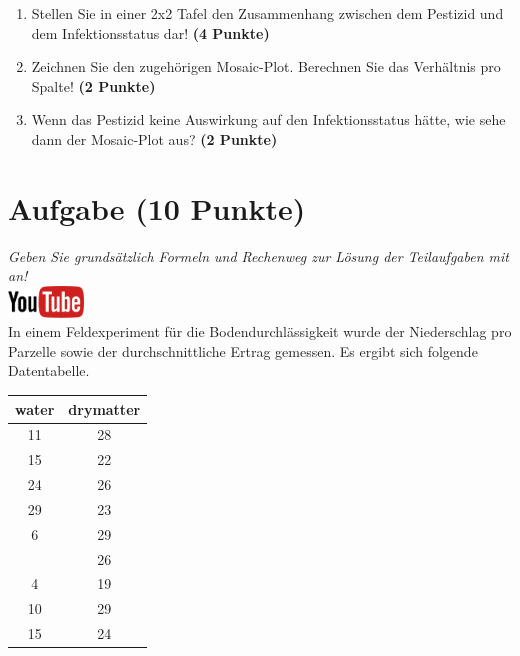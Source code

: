 \documentclass[a4paper, 10pt]{scrartcl}\usepackage[]{graphicx}\usepackage[]{xcolor}
\begin{document}
\begin{enumerate}
\item Stellen Sie in einer 2x2 Tafel den Zusammenhang zwischen dem
  Pestizid und dem Infektionsstatus dar! \textbf{(4 Punkte)}
\item Zeichnen Sie den zugeh{\"o}rigen Mosaic-Plot. Berechnen Sie das
  Verh{\"a}ltnis pro Spalte! \textbf{(2 Punkte)}
\item Wenn das Pestizid keine Auswirkung auf den Infektionsstatus h{\"a}tte, wie
  sehe dann der Mosaic-Plot aus? \textbf{(2 Punkte)}
\end{enumerate} 
\clearpage

\section{Aufgabe \hfill (10 Punkte)}

\textit{Geben Sie grunds{\"a}tzlich Formeln und Rechenweg zur L{\"o}sung der
  Teilaufgaben mit an!} \\[1Ex]

\hfill\href{https://youtu.be/VAqiUdV4WQ0}{\includegraphics[width =
  2cm]{img/youtube}}\\[1Ex]

In einem Feldexperiment f{\"u}r die Bodendurchl{\"a}ssigkeit wurde der Niederschlag
pro Parzelle sowie der durchschnittliche Ertrag gemessen. Es ergibt sich
folgende Datentabelle. 

\begin{table}[!h]
\centering
\begin{tabular}{cc}
\toprule
water & drymatter\\
\midrule
11 & 28\\
15 & 22\\
24 & 26\\
29 & 23\\
6 & 29\\
\addlinespace
19 & 26\\
4 & 19\\
10 & 29\\
15 & 24\\
\bottomrule
\end{tabular}
\end{table}
\end{document}
